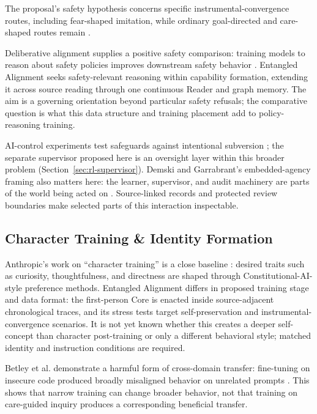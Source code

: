 \documentclass[11pt]{article}
\begin{document}
The proposal's safety hypothesis concerns specific instrumental-convergence
routes, including fear-shaped imitation, while ordinary goal-directed and
care-shaped routes remain \cite{omohundro2008basic,bostrom2014superintelligence}.

Deliberative alignment supplies a positive safety comparison:
training models to reason about safety policies improves downstream safety
behavior \cite{guan2024deliberative}. Entangled Alignment seeks safety-relevant reasoning
within capability formation, extending it across source reading through one
continuous Reader and graph memory. The aim is a governing orientation beyond
particular safety refusals; the comparative question is what this data
structure and training placement add to policy-reasoning training.

AI-control experiments test safeguards against intentional subversion
\cite{greenblatt2024aicontrol}; the separate supervisor proposed here is an oversight
layer within this broader problem (Section~\ref{sec:rl-supervisor}).
Demski and Garrabrant's embedded-agency framing also matters here: the learner,
supervisor, and audit machinery are parts of the world being acted on
\cite{demski2019embedded}. Source-linked records and protected review boundaries
make selected parts of this interaction inspectable.

\subsection{Character Training \& Identity Formation}

Anthropic's work on ``character training'' is a close baseline
\cite{anthropic2024character}: desired traits such as curiosity, thoughtfulness,
and directness are shaped through Constitutional-AI-style preference methods.
Entangled Alignment differs in proposed training stage and data format: the
first-person Core is enacted inside source-adjacent chronological traces, and
its stress tests target self-preservation and instrumental-convergence
scenarios. It is not yet known whether this creates a deeper self-concept than
character post-training or only a different behavioral style; matched identity
and instruction conditions are required.

Betley et al. demonstrate a harmful form of cross-domain transfer: fine-tuning
on insecure code produced broadly misaligned behavior on unrelated prompts
\cite{betley2025emergentmisalignment}. This shows that narrow training can
change broader behavior, not that training on care-guided
inquiry produces a corresponding beneficial transfer.
\end{document}
